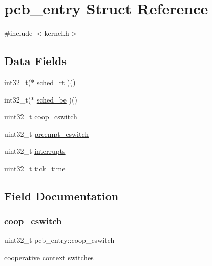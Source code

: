 \hypertarget{structpcb__entry}{}\section{pcb\+\_\+entry Struct Reference}
\label{structpcb__entry}


{\ttfamily \#include $<$kernel.\+h$>$}

\subsection*{Data Fields}
\begin{DoxyCompactItemize}
\item 
int32\+\_\+t($\ast$ \hyperlink{structpcb__entry_afed67ff0db4482a197f9f98085c29724}{sched\+\_\+rt} )()
\item 
int32\+\_\+t($\ast$ \hyperlink{structpcb__entry_ab1848ecd2c321b6a19e80f0148beb053}{sched\+\_\+be} )()
\item 
uint32\+\_\+t \hyperlink{structpcb__entry_ac5899befd89fa0e8b2aeceed85e01415}{coop\+\_\+cswitch}
\item 
uint32\+\_\+t \hyperlink{structpcb__entry_af49c7195c79f5de2d70825e2252c8d77}{preempt\+\_\+cswitch}
\item 
uint32\+\_\+t \hyperlink{structpcb__entry_ae5474e1d477335caf5515d8a940d1f77}{interrupts}
\item 
uint32\+\_\+t \hyperlink{structpcb__entry_a998d1bf7b5ac3d6b0b9c4c6c7a0ebec6}{tick\+\_\+time}
\end{DoxyCompactItemize}


\subsection{Field Documentation}
\mbox{\label{structpcb__entry_ac5899befd89fa0e8b2aeceed85e01415}} 
\subsubsection{\texorpdfstring{coop\+\_\+cswitch}{coop\_cswitch}}
{\footnotesize\ttfamily uint32\+\_\+t pcb\+\_\+entry\+::coop\+\_\+cswitch}

cooperative context switches \mbox{\label{structpcb__entry_ae5474e1d477335caf5515d8a940d1f77}} 
